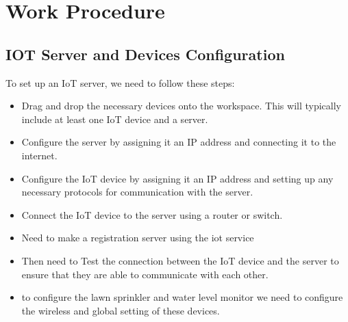 \documentclass{report}
\begin{document}
\section{Work Procedure}
\subsection{IOT Server and Devices Configuration}
To set up an IoT server, we need to follow these steps: \\
\begin{itemize}
    \item Drag and drop the necessary devices onto the workspace. This will typically include at least one IoT device and a server.
    \item Configure the server by assigning it an IP address and connecting it to the internet.
    \item Configure the IoT device by assigning it an IP address and setting up any necessary protocols for communication with the server.
    \item Connect the IoT device to the server using a router or switch.
    \item Need to make a registration server using the iot service
    \item Then need to Test the connection between the IoT device and the server to ensure that they are able to communicate with each other.
    \item to configure the lawn sprinkler and water level monitor we need to configure the wireless and global setting of these devices.
\end{itemize}
\end{document}

